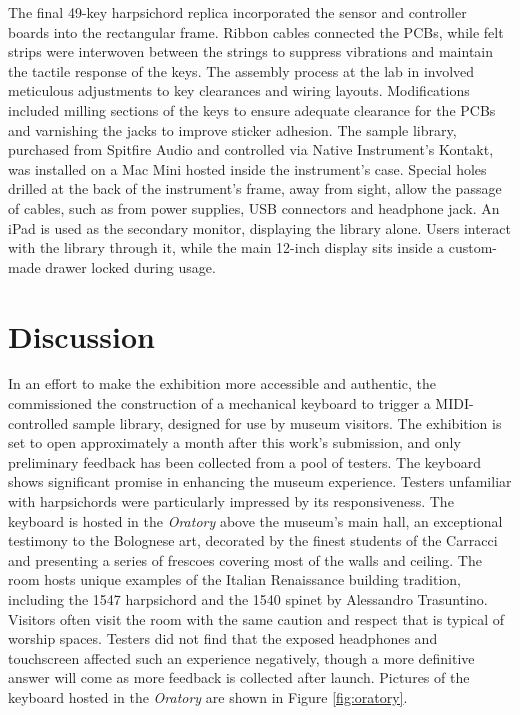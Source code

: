 The final 49-key harpsichord replica incorporated the sensor and controller boards into the rectangular frame. Ribbon cables connected the PCBs, while felt strips were interwoven between the strings to suppress vibrations and maintain the tactile response of the keys. The assembly process at the  lab in  involved meticulous adjustments to key clearances and wiring layouts. Modifications included milling sections of the keys to ensure adequate clearance for the PCBs and varnishing the jacks to improve sticker adhesion. The sample library, purchased from Spitfire Audio and controlled via Native Instrument's Kontakt, was installed on a Mac Mini hosted inside the instrument's case. Special holes drilled at the back of the instrument's frame, away from sight, allow the passage of cables, such as from power supplies, USB connectors and headphone jack. An iPad is used as the secondary monitor, displaying the library alone. Users interact with the library through it, while the main 12-inch display sits inside a custom-made drawer locked during usage.



\section{Discussion}\label{context}


In an effort to make the exhibition more accessible and authentic, the  commissioned the construction of a mechanical keyboard to trigger a MIDI-controlled sample library, designed for use by museum visitors. The exhibition is set to open approximately a month after this work's submission, and only preliminary feedback has been collected from a pool of testers. The keyboard shows significant promise in enhancing the museum experience. Testers unfamiliar with harpsichords were particularly impressed by its responsiveness. The keyboard is hosted in the \emph{Oratory} above the museum's main hall, an exceptional testimony to the Bolognese art, decorated by the finest students of the Carracci and presenting a series of frescoes covering most of the walls and ceiling. The room hosts unique examples of the Italian Renaissance building tradition, including the 1547 harpsichord and the 1540 spinet by Alessandro Trasuntino. Visitors often visit the room with the same caution and respect that is typical of worship spaces. Testers did not find that the exposed headphones and touchscreen affected such an experience negatively, though a more definitive answer will come as more feedback is collected after launch. Pictures of the keyboard hosted in the \emph{Oratory} are shown in Figure \ref{fig:oratory}.

